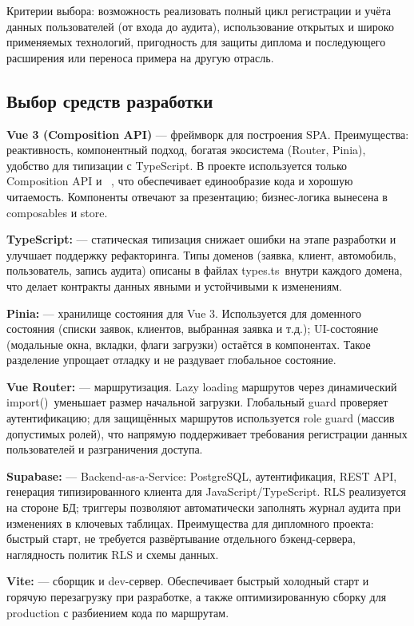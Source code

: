 Критерии выбора: возможность реализовать полный цикл регистрации и учёта данных пользователей (от входа до аудита), использование открытых и широко применяемых технологий, пригодность для защиты диплома и последующего расширения или переноса примера на другую отрасль.

\subsection{Выбор средств разработки}

\textbf{Vue 3 (Composition API)} — фреймворк для построения SPA. Преимущества: реактивность, компонентный подход, богатая экосистема (Router, Pinia), удобство для типизации с TypeScript. В проекте используется только Composition API и \textquotedbl\ , что обеспечивает единообразие кода и хорошую читаемость. Компоненты отвечают за презентацию; бизнес-логика вынесена в composables и store.

\textbf{TypeScript:} — статическая типизация снижает ошибки на этапе разработки и улучшает поддержку рефакторинга. Типы доменов (заявка, клиент, автомобиль, пользователь, запись аудита) описаны в файлах \textquotedbl types.ts\textquotedbl\ внутри каждого домена, что делает контракты данных явными и устойчивыми к изменениям.

\textbf{Pinia:} — хранилище состояния для Vue 3. Используется для доменного состояния (списки заявок, клиентов, выбранная заявка и т.д.); UI-состояние (модальные окна, вкладки, флаги загрузки) остаётся в компонентах. Такое разделение упрощает отладку и не раздувает глобальное состояние.

\textbf{Vue Router:} — маршрутизация. Lazy loading маршрутов через динамический \textquotedbl import()\textquotedbl\ уменьшает размер начальной загрузки. Глобальный guard проверяет аутентификацию; для защищённых маршрутов используется role guard (массив допустимых ролей), что напрямую поддерживает требования регистрации данных пользователей и разграничения доступа.

\textbf{Supabase:} — Backend-as-a-Service: PostgreSQL, аутентификация, REST API, генерация типизированного клиента для JavaScript/TypeScript. RLS реализуется на стороне БД; триггеры позволяют автоматически заполнять журнал аудита при изменениях в ключевых таблицах. Преимущества для дипломного проекта: быстрый старт, не требуется развёртывание отдельного бэкенд-сервера, наглядность политик RLS и схемы данных.

\textbf{Vite:} — сборщик и dev-сервер. Обеспечивает быстрый холодный старт и горячую перезагрузку при разработке, а также оптимизированную сборку для production с разбиением кода по маршрутам.

